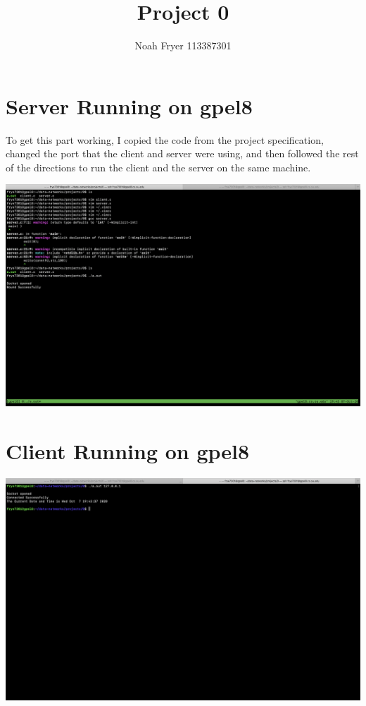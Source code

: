 \documentclass[12pt,letterpaper]{article}
\author{Noah Fryer 113387301}
\title{Project 0}
\begin{document}
    \maketitle
    
    \section*{Server Running on gpel8}

    To get this part working, I copied the code from the project specification, changed the port that the client and server were using, and then followed the rest of the directions to run the client and the server on the same machine.

    \vspace{1 cm}

    \includegraphics[scale=0.25]{server-client-local.png}
    
    \section*{Client Running on gpel8}
    
    \includegraphics[scale=0.25]{client-server-local.png}
\end{document}
